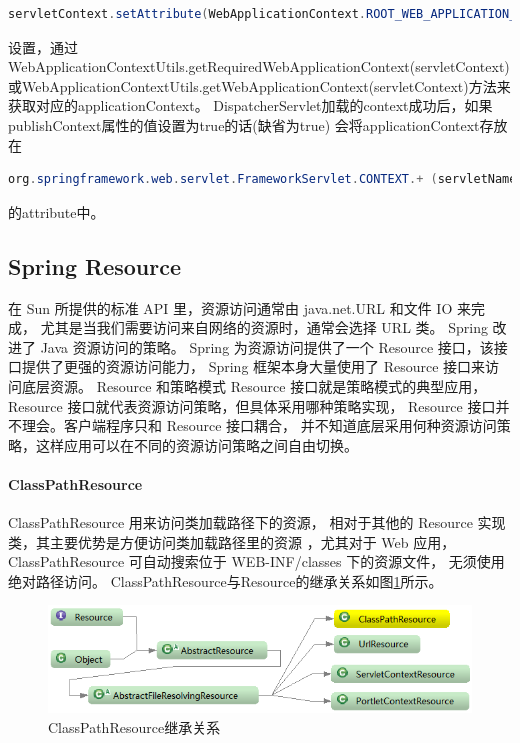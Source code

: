 \documentclass{book}
\begin{document}
\begin{lstlisting}[language=Java]
servletContext.setAttribute(WebApplicationContext.ROOT_WEB_APPLICATION_CONTEXT_ATTRIBUTE, this.context)
\end{lstlisting}

设置，通过WebApplicationContextUtils.getRequiredWebApplicationContext(servletContext)
或WebApplicationContextUtils.getWebApplicationContext(servletContext)方法来获取对应的applicationContext。
DispatcherServlet加载的context成功后，如果publishContext属性的值设置为true的话(缺省为true)
会将applicationContext存放在

\begin{lstlisting}[language=Java]
org.springframework.web.servlet.FrameworkServlet.CONTEXT.+ (servletName)
\end{lstlisting}

的attribute中。

\subsection{Spring Resource}

在 Sun 所提供的标准 API 里，资源访问通常由 java.net.URL 和文件 IO 来完成，
尤其是当我们需要访问来自网络的资源时，通常会选择 URL 类。
Spring 改进了 Java 资源访问的策略。
Spring 为资源访问提供了一个 Resource 接口，该接口提供了更强的资源访问能力，
Spring 框架本身大量使用了 Resource 接口来访问底层资源。
Resource 和策略模式 Resource 接口就是策略模式的典型应用，
Resource 接口就代表资源访问策略，但具体采用哪种策略实现，
Resource 接口并不理会。客户端程序只和 Resource 接口耦合，
并不知道底层采用何种资源访问策略，这样应用可以在不同的资源访问策略之间自由切换。

\paragraph{ClassPathResource}

ClassPathResource 用来访问类加载路径下的资源，
相对于其他的 Resource 实现类，其主要优势是方便访问类加载路径里的资源
，尤其对于 Web 应用，ClassPathResource 可自动搜索位于 WEB-INF/classes 下的资源文件，
无须使用绝对路径访问。
ClassPathResource与Resource的继承关系如图\ref{fig:ClassPathResource}所示。

\begin{figure}[htbp]
	\centering
	\includegraphics[scale=0.6]{ClassPathResource.png}
	\caption{ClassPathResource继承关系}
	\label{fig:ClassPathResource}
\end{figure}
\end{document}
